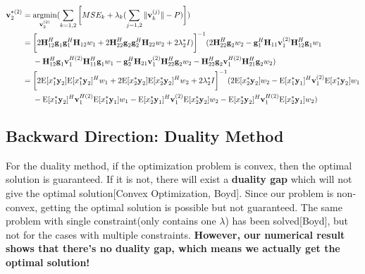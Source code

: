 \documentclass[11pt, oneside]{article}   	%
\begin{document}
\begin{align*}
\textbf{v}^{*(2)}_{2} 	&= \operatornamewithlimits{argmin}_{\textbf{v}^{(2)}_{2}}	(\displaystyle\sum_{k=1,2} 	\bigg[	MSE_{k}	+	\lambda_{k}	(\displaystyle\sum_{j=1,2}	\|	\textbf{v}^{(j)}_{k}	\|	-P	)	\bigg])	\\
				   &= 	\bigg[ 2	\textbf{H}^{H}_{12}	\textbf{g}_{1}	\textbf{g}^{H}_{1}		\textbf{H}_{12}	w_1
				   +	2	\textbf{H}^{H}_{22}	\textbf{g}_{2}	\textbf{g}^{H}_{2}		\textbf{H}_{22}	w_2	+2	\lambda^{*}_2 I)
				   \bigg]^{-1} 
				   (2	\textbf{H}^{H}_{22}	\textbf{g}_{2}	w_2		
				   -	\textbf{g}^{H}_{1}	\textbf{H}_{11}	\textbf{v}^{(2)}_{1} 	\textbf{H}^{H}_{12}	\textbf{g}_{1} w_1	\\
				   &\ \ \ \ 
				   -	\textbf{H}^{H}_{12}	\textbf{g}_{1}	\textbf{v}^{H(2)}_{1}	\textbf{H}^{H}_{11}	\textbf{g}_{1}	w_1
				   -	\textbf{g}^{H}_{2}	\textbf{H}_{21}	\textbf{v}^{(2)}_{1} 	\textbf{H}^{H}_{22}	\textbf{g}_{2}	w_2
				   -	\textbf{H}^{H}_{22}	\textbf{g}_{2}	\textbf{v}^{H(2)}_{1}	\textbf{H}^{H}_{21}	\textbf{g}_{2}	w_2
				   )\\
				   &=\bigg[	2	\mathrm{E}[x^*_1	\textbf{y}_2]	\mathrm{E}[x^*_1	\textbf{y}_2]^H	w_1
			      			+	2	\mathrm{E}[x^*_2	\textbf{y}_2]	\mathrm{E}[x^*_2	\textbf{y}_2]^H	w_2	+2	\lambda^{*}_2 I
			      	  \bigg]^{-1} 
				  (2	\mathrm{E}[x^*_2	\textbf{y}_2]	w_2
				  -\mathrm{E}[x^*_1	\textbf{y}_1]^H	\textbf{v}^{(2)}_{1} 	\mathrm{E}[x^*_1	\textbf{y}_2]	w_1	\\
				  &\ \ \ \ 	
				  -\mathrm{E}[x^*_1	\textbf{y}_2]^H	\textbf{v}^{H(2)}_{1} 	\mathrm{E}[x^*_1	\textbf{y}_1]	w_1	
				  -\mathrm{E}[x^*_2	\textbf{y}_1]^H	\textbf{v}^{(2)}_{1} 	\mathrm{E}[x^*_2	\textbf{y}_2]	w_2
				   -\mathrm{E}[x^*_2	\textbf{y}_2]^H	\textbf{v}^{H(2)}_{1} 	\mathrm{E}[x^*_2	\textbf{y}_1]	w_2	
				   )
\end{align*}




\subsection{Backward Direction: Duality Method}
For the duality method, if the optimization problem is convex, then the optimal solution is guaranteed. If it is not, there will exist a \textbf{duality gap} which will not give the optimal solution[Convex Optimization, Boyd]. Since our problem is non-convex, getting the optimal solution is possible but not guaranteed. The same problem with single constraint(only contains one $\lambda$) has been solved[Boyd], but not for the cases with multiple constraints. \textbf{However, our numerical result shows that there's no duality gap, which means we actually get the optimal solution!}
\end{document}
